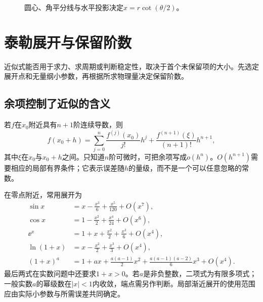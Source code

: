 \begin{solution}
\begin{figure}[H]\centering
{}
\caption{圆心、角平分线与水平投影决定$x=r\cot(\theta/2)$。}\label{fig:c1-e3-s}
\end{figure}
\end{solution}

\section{泰勒展开与保留阶数}\label{sec:c1-taylor}
近似式能否用于求力、求周期或判断稳定性，取决于首个未保留项的大小。先选定展开点和无量纲小参数，再根据所求物理量决定保留阶数。

\subsection{余项控制了近似的含义}
若$f$在$x_0$附近具有$n+1$阶连续导数，则
\begin{equation}\label{eq:c1-taylor}
 f(x_0+h)=\sum_{j=0}^n\frac{f^{(j)}(x_0)}{j!}h^j
+\frac{f^{(n+1)}(\xi)}{(n+1)!}h^{n+1},
\end{equation}
其中$\xi$在$x_0$与$x_0+h$之间。只知道$n$阶可微时，可把余项写成$o(h^n)$。$O(h^{n+1})$需要相应的局部有界条件；它表示误差随$h$的量级，而不是一个可以任意忽略的常数。

在零点附近，常用展开为
\begin{align}
\sin x&=x-\frac{x^3}{6}+\frac{x^5}{120}+O(x^7),\\
\cos x&=1-\frac{x^2}{2}+\frac{x^4}{24}+O(x^6),\\
\ee^x&=1+x+\frac{x^2}{2}+\frac{x^3}{6}+O(x^4),\\
\ln(1+x)&=x-\frac{x^2}{2}+\frac{x^3}{3}+O(x^4),\\
(1+x)^a&=1+ax+\frac{a(a-1)}2x^2+\frac{a(a-1)(a-2)}6x^3+O(x^4).
\end{align}
最后两式在实数问题中还要求$1+x>0$。若$a$是非负整数，二项式为有限多项式；一般实数$a$的幂级数在$|x|<1$内收敛，端点需另作判断。局部渐近展开的使用范围应由实际小参数与所需误差共同确定。

